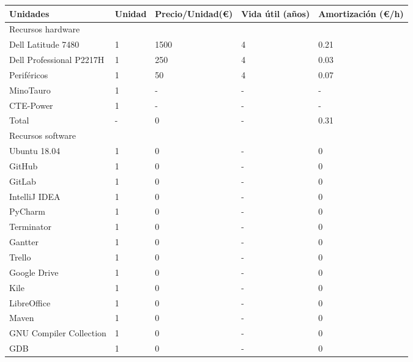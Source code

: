 \begin{table}[H]
\centering
 \begin{tabular}{| l | l | l | l | l |}
    \hline
    Unidades & Unidad & Precio/Unidad(\euro) & Vida útil (años) & Amortización (\euro/h) \\
    \hline
    \cline{1-1}
    \rowcolor{gray!50}
    Recursos hardware \\
    \hline
    Dell Latitude 7480          & 1 & 1500  & 4 & 0.21\\
    \hline 
    Dell Professional P2217H    & 1 & 250   & 4 & 0.03\\
    \hline
    Periféricos                 & 1 & 50    & 4 & 0.07\\
    \hline
    MinoTauro                   & 1 & -     & - & -\\
    \hline
    CTE-Power                   & 1 & -     & - & -\\
    \hline
    \rowcolor{gray!50}
    Total                       & - & 0     & - & 0.31\\
    \hline
    \cline{1-1}
    \rowcolor{gray!50}
    Recursos software \\
    \hline
    Ubuntu 18.04                & 1 & 0     & - & 0\\
    \hline
    GitHub                      & 1 & 0     & - & 0\\
    \hline
    GitLab                      & 1 & 0     & - & 0\\
    \hline
    IntelliJ IDEA               & 1 & 0     & - & 0\\
    \hline
    PyCharm                     & 1 & 0     & - & 0\\
    \hline
    Terminator                  & 1 & 0     & - & 0\\
    \hline
    Gantter                     & 1 & 0     & - & 0\\
    \hline
    Trello                      & 1 & 0     & - & 0\\
    \hline
    Google Drive                & 1 & 0     & - & 0\\
    \hline
    Kile                        & 1 & 0     & - & 0\\
    \hline
    LibreOffice                 & 1 & 0     & - & 0\\
    \hline
    Maven                       & 1 & 0     & - & 0\\
    \hline
    GNU Compiler Collection     & 1 & 0     & - & 0\\
    \hline
    GDB                         & 1 & 0     & - & 0\\

\end{tabular}
\end{table}
